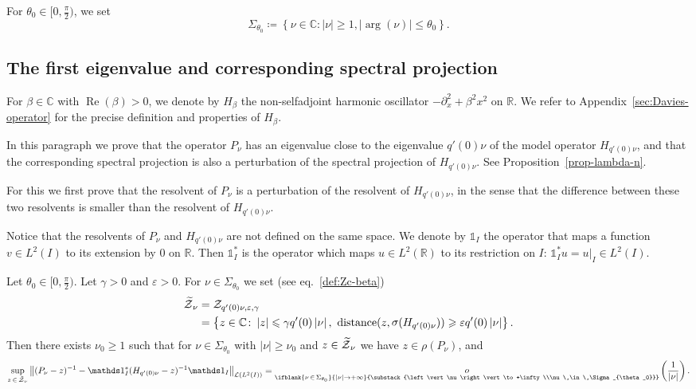 \documentclass[10pt]{amsart}
\theoremstyle{definition}\newtheorem{defi}[theo]{Definition}\newtheorem{rema}[theo]{Remark}\newtheorem{exam}[theo]{Example}\newtheorem{exem}[theo]{Example}\newtheorem{nota}[theo]{Notation}
\newcommand{\abs}[1]{\left\vert #1\right\vert}
\newcommand{\nr}[1]{\left\Vert #1\right\Vert}
\newcommand{\set}[1]{\left\{ #1 \right\}}
\renewcommand{\leq}{\leqslant}
\renewcommand{\geq}{\geqslant}
\newcommand{\inv}{^{-1}}
\newcommand{\littleo}[3][]{\mathop{o}\limits_{\ifblank{#1}{#2 \to #3}{\substack{#2\to #3\\#1}}}}
\newcommand{\1}{\mathds 1}
\DeclareMathOperator{\Ree}{Re}
\DeclareMathOperator{\Sp}{\s}
\DeclareMathOperator{\distance}{distance}
\newcommand{\R}{\mathbb{R}}
\newcommand{\C}{\mathbb{C}}
\newcommand{\Lc}{{\mathcal L}}
\newcommand{\Zc}{\mathcal Z}
\newcommand{\sector}[1][\theta_0]{\Sigma_{#1}}
\renewcommand{\b}{\beta}
\newcommand{\e}{\varepsilon}
\renewcommand{\th}{\theta}
\newcommand{\s}{\sigma}
\let\oldtilde\tilde
\renewcommand*{\tilde}[1]{\mathchoice{\widetilde{#1}}{\widetilde{#1}}{\oldtilde{#1}}{\oldtilde{#1}}}
\begin{document}
For $\theta_0\in [0,\frac{\pi}{2})$, we set
\begin{equation}\label{def:sector}
\sector \coloneqq \set{ \nu \in \C \colon \abs \nu \geq 1, \abs{\arg(\nu)} \leq \th_0}.
\end{equation}

\subsection{The first eigenvalue and corresponding spectral projection}

For $\b \in \C$ with $\Ree(\b)>0$, we denote by $H_\b$ the non-selfadjoint harmonic oscillator $-\partial_x^2 + \b^2 x^2$ on $\R$. We refer to Appendix~\ref{sec:Davies-operator} for the precise definition and properties of $H_\b$.


In this paragraph we prove that the operator $P_\nu$ has an eigenvalue close to the eigenvalue $q'(0) \nu$ of the model operator $H_{q'(0) \nu}$, and that the corresponding spectral projection is also a perturbation of the spectral projection of $H_{q'(0)\nu}$. See Proposition~\ref{prop-lambda-n}.

For this we first prove that the resolvent of $P_\nu$ is a perturbation of the resolvent of $H_{q'(0)\nu}$, in the sense that the difference between these two resolvents is smaller than the resolvent of $H_{q'(0)\nu}$.


Notice that the resolvents of $P_\nu$ and $H_{q'(0)\nu}$ are not defined on the same space. We denote by $\1_I$ the operator that maps a function $v \in L^2(I)$ to its extension by 0 on $\R$. Then $\1_I^*$ is the operator which maps $u \in L^2(\R)$ to its restriction on $I$: $\1_I^* u = u|_{I} \in L^2(I)$.


\begin{prop}\label{prop:res-Pnu}
Let $\theta_0 \in [0,\frac \pi 2)$. Let $\gamma > 0$ and $\e > 0$. For $\nu \in \sector$ we set (see eq.~\eqref{def:Zc-beta})
\begin{equation}\label{def:Zc}
\begin{split}
\tilde \Zc_\nu &= \Zc_{q'(0)\nu,\e,\gamma }\\
&= \set{z \in \C \colon \abs z \leq \gamma q'(0) \abs \nu,\ \distance(z, \Sp(H_{q'(0)\nu})) \geq \e q'(0) \abs \nu}.
\end{split}
\end{equation}
Then there exists $\nu_0 \geq 1$ such that for $\nu \in \sector$ with $\abs \nu \geq \nu_0$ and $z \in \tilde \Zc_\nu$ we have $z \in \rho(P_\nu)$, and
\[
\sup_{z\,\in\,\tilde \Zc_\nu} \nr{(P_\nu-z)\inv - \1_I^* (H_{q'(0)\nu}-z)\inv \1_I }_{\Lc\left(L^2(I)\right)} = \littleo[\nu\,\in\,\sector]{\abs \nu} {+\infty} \left(\frac 1 {\abs \nu} \right).
\]
\end{prop}
\end{document}
